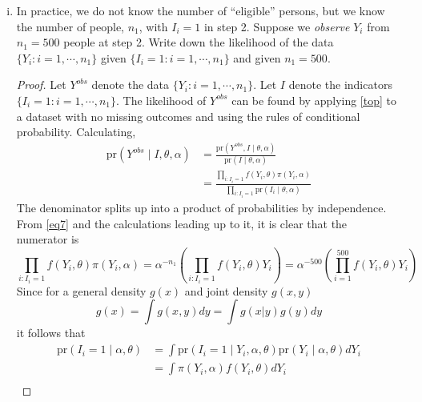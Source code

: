 \documentclass[letterpaper, 12pt]{article}
\newcommand{\pr}{\text{pr}}
\newcommand{\sbs}{\;|\;} %
\begin{document}
\begin{enumerate}[(i)]
\item
In practice, we do not know the number of ``eligible'' persons, but we know the number of people, $n_1$, with $I_i = 1$ in step 2. 
Suppose we \textit{observe} $Y_i$ from $n_1 = 500$ people at step 2.
Write down the likelihood of the data $\{Y_i : i = 1, \cdots, n_1\}$ given $\{I_i = 1 : i = 1, \cdots, n_1\}$ and given $n_1 = 500$. 

\begin{proof}
Let $Y^{obs}$ denote the data $\{Y_i : i = 1, \cdots, n_1\}$. 
Let $I$ denote the indicators $\{I_i = 1 : i=1, \cdots, n_1\}$. The likelihood of $Y^{obs}$ can be found by applying \eqref{top} to a dataset with no missing outcomes and using the rules of conditional probability. Calculating,
\begin{align}
\pr(Y^{obs} \sbs I, \theta, \alpha) 
&= 
\frac{\pr(Y^{obs}, I \sbs \theta, \alpha)}
{\pr(I \sbs \theta, \alpha)} 
\\
&=
\frac{\prod_{i:I_i = 1} f(Y_i,\theta) \pi (Y_i, \alpha)}
{\prod_{i:I_i = 1}\pr(I_i \sbs \theta, \alpha)}
\label{halfformed}
\end{align}
The denominator splits up into a product of probabilities by independence.
From \eqref{eq7} and the calculations leading up to it, it is clear that the numerator is
\begin{equation}
\prod_{i:I_i = 1} f(Y_i,\theta) \pi (Y_i, \alpha)
=
\alpha^{-n_1}\left(\prod_{i:I_i = 1} f(Y_i,\theta) Y_i\right)
=
\alpha^{-500}\left(\prod_{i = 1}^{500} f(Y_i,\theta) Y_i\right)
\label{numer}
\end{equation}
Since for a general density $g(x)$ and joint density $g(x,y)$
\begin{equation}
g(x) = \int g(x,y) dy = \int g(x | y) g(y) dy
\end{equation}
it follows that
\begin{align}
\pr(I_i = 1 \sbs \alpha, \theta) 
&= \int \pr(I_i = 1 \sbs Y_i, \alpha, \theta) 
\pr(Y_i \sbs \alpha, \theta) dY_i \\
&= \int \pi(Y_i, \alpha) f(Y_i, \theta) dY_i \\

\end{align}
\end{proof}
\end{enumerate}
\end{document}
